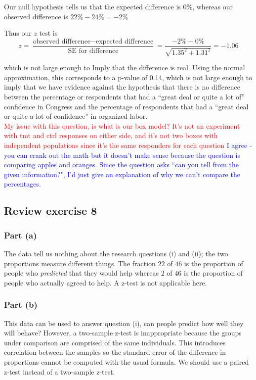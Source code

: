 \documentclass[11pt]{article}
\begin{document}
\noindent Our null hypothesis tells us that the expected difference is $0\%$, whereas our observed difference is $22\% - 24\% = -2\%$

\noindent Thus our $z$ test is
$$z = \frac{\text{observed difference} - \text{expected difference}}{\text{SE for difference}} = \frac{ - 2\% - 0\%}{\sqrt{1.35^2 + 1.31^2}} = -1.06$$

\noindent which is not large enough to Imply that the difference is real. Using the normal approximation, this corresponds to a p-value of 0.14, which is not large enough to imply that we have evidence against the hypothesis that there is no difference between the percentage or respondents that had a ``great deal or quite a lot of''  confidence in Congress and the percentage of respondents that had a ``great deal or quite a lot of confidence'' in organized labor.\\

\noindent \textcolor{red}{My issue with this question, is what is our box model? It's not an experiment with tmt and ctrl responses on either side, and it's not two boxes with independent populations since it's the same responders for each question}
\textcolor{blue}{ I agree - you can crank out the math but it doesn't make sense because the question is comparing apples and oranges.  Since the question asks ``can you tell from the given information?", I'd just give an explanation of why we can't compare the percentages.} %




\subsection*{Review exercise 8} %
\subsubsection*{Part (a)}
The data tell us nothing about the research questions (i) and (ii); the two proportions measure different things.  The fraction $22$ of $46$ is the proportion of people who \textit{predicted} that they would help whereas $2$ of $46$ is the proportion of people who actually agreed to help.  A z-test is not applicable here.

\subsubsection*{Part (b)}
This data can be used to answer question (i), can people predict how well they will behave?  However, a two-sample z-test is inappropriate because the groups under comparison are comprised of the same individuals.  This introduces correlation between the samples so the standard error of the difference in proportions cannot be computed with the usual formula.  We should use a paired z-test instead of a two-sample z-test.
\end{document}
